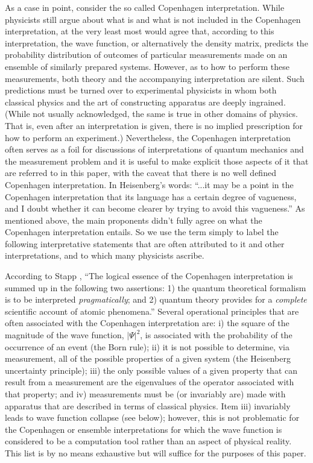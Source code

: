 \documentclass [12pt]{revtex4}
\begin{document}
As a case in point, consider the so called Copenhagen interpretation.
While physicists still argue about what is and what is not included
in the Copenhagen interpretation, at the very least most would agree
that, according to this interpretation, the wave function, or
alternatively the density matrix, predicts the probability
distribution of outcomes of particular measurements made on an
ensemble of similarly prepared systems. However, as to how to
perform these measurements, both theory and the accompanying
interpretation are silent. Such predictions must be turned over to
experimental physicists in whom both classical physics and the art
of constructing apparatus are deeply ingrained. (While not
usually acknowledged, the same is true in other domains of physics.
That is, even after an interpretation is given, there is no
implied prescription for how to perform an experiment.)  Nevertheless,
the Copenhagen interpretation often serves as a foil
for discussions of interpretations of quantum mechanics and the
measurement problem and it is useful to make explicit those aspects
of it that are referred to in this paper, with the caveat that there
is no well defined Copenhagen interpretation. In Heisenberg's words:
``...it may be a point in the Copenhagen interpretation that its
language has a certain degree of vagueness, and I doubt whether it
can become clearer by trying to avoid this vagueness.'' \cite{S1972}
As mentioned above, the main proponents didn't fully agree on
what the Copenhagen interpretation entails. So we use the term
simply to label the following interpretative statements that are
often attributed to it and other interpretations, and to which
many physicists ascribe.

According to Stapp \cite{S1972}, ``The logical essence of the Copenhagen
interpretation is summed up in the following two assertions: 1) the
quantum theoretical formalism is to be interpreted
\textit{pragmatically}; and 2) quantum theory provides for a
\textit{complete} scientific account of atomic phenomena.'' Several
operational principles that are often associated with the Copenhagen
interpretation are: i) the square of the magnitude of the wave
function, $\vert \Psi \vert ^{2}$, is associated with the
probability of the occurrence of an event (the Born rule); ii) it is
not possible to determine, via measurement, all of the possible
properties of a given system (the Heisenberg uncertainty principle); iii)
the only possible values of a given property that can result from a
measurement are the eigenvalues of the operator associated with that
property; and iv) measurements must be (or invariably are) made
with apparatus that are described in terms of classical physics.
Item iii) invariably leads to wave function collapse (see below);
however, this is not problematic for the Copenhagen or ensemble
interpretations for which the wave function is considered
to be a computation tool rather than an aspect of physical reality.
This list is by no means exhaustive but will suffice for the
purposes of this paper.
\end{document}
